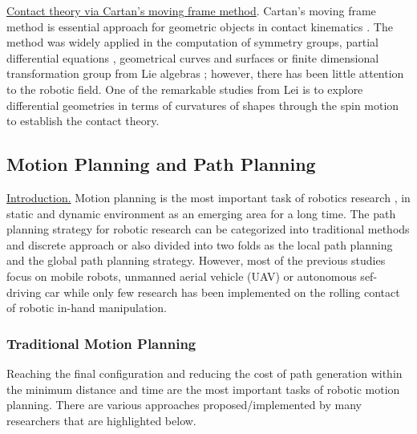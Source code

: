 
\noindent\uline{Contact theory via Cartan's moving frame method}. Cartan's moving frame method is essential approach for geometric objects in contact kinematics \cite{H.Cartan96,E.Cartan02}. The method  was widely applied in the computation of symmetry groups, partial differential equations \cite{Mansfield01_AlgorithmSymmetric_Diff, Morozov02_MovingFrame}, geometrical curves and surfaces \cite{Beffa03_relative_Absolute_DiffInvariant, Beffa06_PoissonGeometry_DiffInvariant} or finite dimensional transformation group from Lie algebras \cite{Boyko06_LieAlgebra, Boyko07_LieAlgebra}; however, there has been little attention to the robotic field. One of the remarkable studies from Lei \cite{Lei10_Darboux-Frame} is to explore differential geometries in terms of curvatures of shapes through the spin motion to establish the contact theory. \\

 

\subsection{Motion Planning and Path Planning}
\uline{Introduction.} 
Motion planning is the most important task of robotics research \cite*{Sudsang_2000_Grasping_In-hand_manipulation},\cite*{Pajarinen_2017_R.Manipulation_POMDP} in static and dynamic environment as an emerging area for a long time. The path planning strategy for robotic research can be categorized into traditional methods and discrete approach or also divided into two folds as the local path planning and the global path planning strategy. However, most of the previous studies focus on mobile robots, unmanned aerial vehicle (UAV) or autonomous sef-driving car while only few research has been implemented on the rolling contact of robotic in-hand manipulation. 

\subsubsection{Traditional Motion Planning}
Reaching the final configuration and reducing the cost of path generation within the minimum distance and time are the most important tasks of robotic motion planning. There are various approaches proposed/implemented by many researchers that are highlighted below.\\

